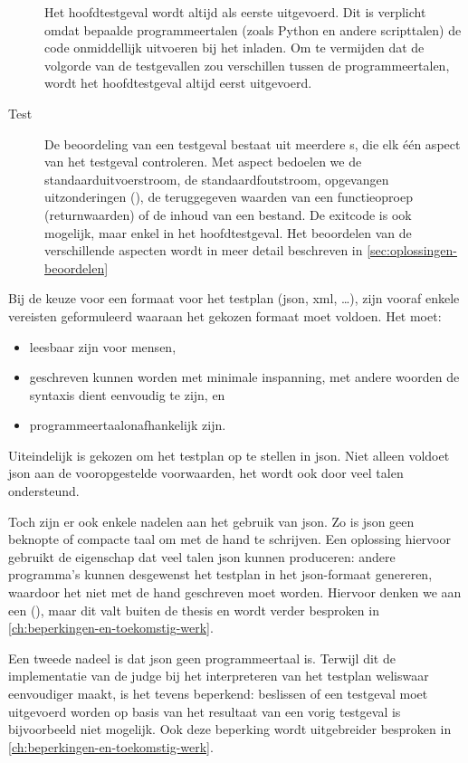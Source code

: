 \begin{description}
\begin{description}
    \end{description}
    Het hoofdtestgeval wordt altijd als eerste uitgevoerd.
    Dit is verplicht omdat bepaalde programmeertalen (zoals Python en andere scripttalen) de code onmiddellijk uitvoeren bij het inladen.
    Om te vermijden dat de volgorde van de testgevallen zou verschillen tussen de programmeertalen, wordt het hoofdtestgeval altijd eerst uitgevoerd.
    \item[Test] De beoordeling van een testgeval bestaat uit meerdere s, die elk één aspect van het testgeval controleren.
    Met aspect bedoelen we de standaarduitvoerstroom, de standaardfoutstroom, opgevangen uitzonderingen (), de teruggegeven waarden van een functieoproep (returnwaarden) of de inhoud van een bestand.
    De exitcode is ook mogelijk, maar enkel in het hoofdtestgeval.
    Het beoordelen van de verschillende aspecten wordt in meer detail beschreven in \cref{sec:oplossingen-beoordelen}
\end{description}

Bij de keuze voor een formaat voor het testplan (json, xml, \ldots), zijn vooraf enkele vereisten geformuleerd waaraan het gekozen formaat moet voldoen.
Het moet:

\begin{itemize}
    \item leesbaar zijn voor mensen,
    \item geschreven kunnen worden met minimale inspanning, met andere woorden de syntaxis dient eenvoudig te zijn, en
    \item programmeertaalonafhankelijk zijn.
\end{itemize}

Uiteindelijk is gekozen om het testplan op te stellen in json.
Niet alleen voldoet json aan de vooropgestelde voorwaarden, het wordt ook door veel talen ondersteund.

Toch zijn er ook enkele nadelen aan het gebruik van json.
Zo is json geen beknopte of compacte taal om met de hand te schrijven.
Een oplossing hiervoor gebruikt de eigenschap dat veel talen json kunnen produceren: andere programma's kunnen desgewenst het testplan in het json-formaat genereren, waardoor het niet met de hand geschreven moet worden.
Hiervoor denken we aan een  (), maar dit valt buiten de thesis en wordt verder besproken in \cref{ch:beperkingen-en-toekomstig-werk}.

Een tweede nadeel is dat json geen programmeertaal is.
Terwijl dit de implementatie van de judge bij het interpreteren van het testplan weliswaar eenvoudiger maakt, is het tevens beperkend: beslissen of een testgeval moet uitgevoerd worden op basis van het resultaat van een vorig testgeval is bijvoorbeeld niet mogelijk.
Ook deze beperking wordt uitgebreider besproken in \cref{ch:beperkingen-en-toekomstig-werk}.

